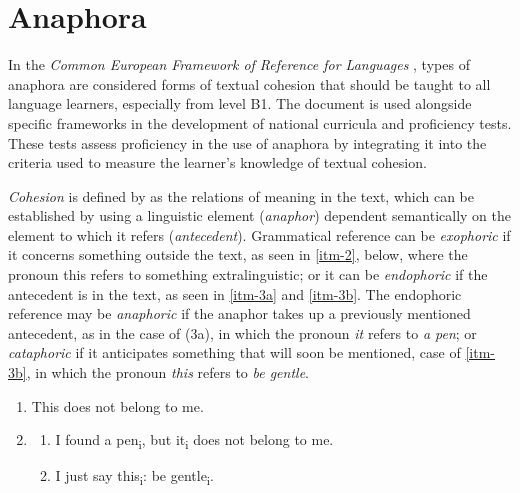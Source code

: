 \documentclass{textolivre}
\begin{document}
\section{Anaphora}\label{sec-anaphora}
In the \emph{Common European Framework of Reference for Languages} \cite[p. 140]{council_of_europe_common_2009},
types of anaphora are considered forms of textual cohesion that
should be taught to all language learners, especially from level B1. The
document is used alongside specific frameworks in the development of national
curricula and proficiency tests. These tests assess proficiency in the use of
anaphora by integrating it into the criteria used to measure the learner's
knowledge of textual cohesion.

\emph{Cohesion} is defined by \textcite[p. 4]{halliday_cohesion_1976} as the relations
of meaning in the text, which can be established by using a linguistic element
(\emph{anaphor}) dependent semantically on the element to which it refers
(\emph{antecedent}). Grammatical reference can be \emph{exophoric} if it concerns something
outside the text, as seen in \ref{itm-2}, below, where the pronoun this refers to
something extralinguistic; or it can be \emph{endophoric} if the antecedent is in the
text, as seen in \ref{itm-3a} and \ref{itm-3b}. The endophoric reference may be \emph{anaphoric} if
the anaphor takes up a previously mentioned antecedent, as in the case of (3a),
in which the pronoun \emph{it} refers to \emph{a pen}; or \emph{cataphoric} if it anticipates
something that will soon be mentioned, case of \ref{itm-3b}, in which the pronoun \emph{this}
refers to \emph{be gentle}.

%
%

\begin{enumerate}[wide,label=(\arabic*),topsep=1ex,partopsep=1ex,noitemsep,leftmargin=0.15cm,resume]
\setlength{\itemindent}{0em}
\item \label{itm-2} This does not belong to me.
\item[]{} \addtocounter{enumi}{1} 
\begin{enumerate}[wide,label=(\arabic{enumi}\alph*),topsep=1ex,partopsep=1ex,noitemsep]
\setlength{\itemindent}{0em}
\item \label{itm-3a} I found a pen\textsubscript{i}, but it\textsubscript{i} does not belong to me.
\item \label{itm-3b} I just say this\textsubscript{i}: be gentle\textsubscript{i}.
\end{enumerate}
\end{enumerate}
\end{document}
